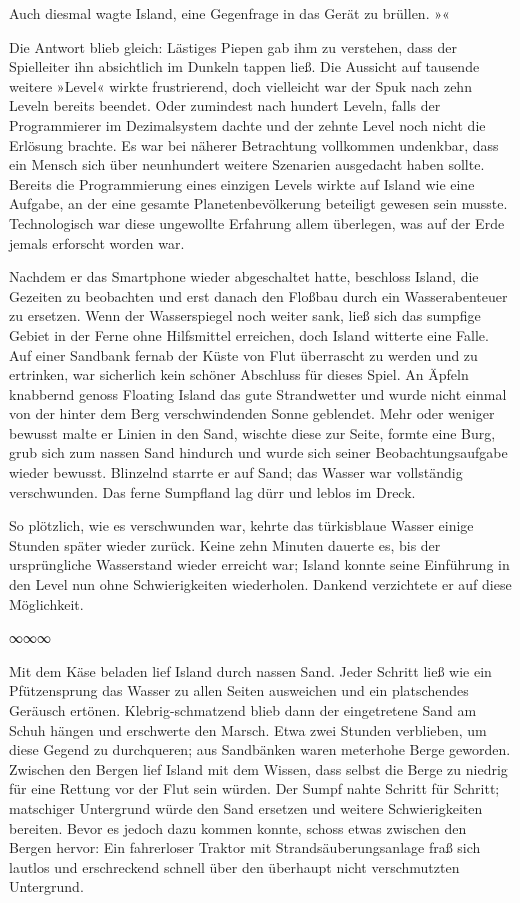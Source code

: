 
Auch diesmal wagte Island, eine Gegenfrage in das Gerät zu brüllen. »«

Die Antwort blieb gleich: Lästiges Piepen gab ihm zu verstehen, dass der Spielleiter ihn absichtlich im Dunkeln tappen ließ. Die Aussicht auf tausende weitere »Level« wirkte frustrierend, doch vielleicht war der Spuk nach zehn Leveln bereits beendet. Oder zumindest nach hundert Leveln, falls der Programmierer im Dezimalsystem dachte und der zehnte Level noch nicht die Erlösung brachte. Es war bei näherer Betrachtung vollkommen undenkbar, dass ein Mensch sich über neunhundert weitere Szenarien ausgedacht haben sollte. Bereits die Programmierung eines einzigen Levels wirkte auf Island wie eine Aufgabe, an der eine gesamte Planetenbevölkerung beteiligt gewesen sein musste. Technologisch war diese ungewollte Erfahrung allem überlegen, was auf der Erde jemals erforscht worden war.

Nachdem er das Smartphone wieder abgeschaltet hatte, beschloss Island, die Gezeiten zu beobachten und erst danach den Floßbau durch ein Wasserabenteuer zu ersetzen. Wenn der Wasserspiegel noch weiter sank, ließ sich das sumpfige Gebiet in der Ferne ohne Hilfsmittel erreichen, doch Island witterte eine Falle. Auf einer Sandbank fernab der Küste von Flut überrascht zu werden und zu ertrinken, war sicherlich kein schöner Abschluss für dieses Spiel. An Äpfeln knabbernd genoss Floating Island das gute Strandwetter und wurde nicht einmal von der hinter dem Berg verschwindenden Sonne geblendet. Mehr oder weniger bewusst malte er Linien in den Sand, wischte diese zur Seite, formte eine Burg, grub sich zum nassen Sand hindurch und wurde sich seiner Beobachtungsaufgabe wieder bewusst. Blinzelnd starrte er auf Sand; das Wasser war vollständig verschwunden. Das ferne Sumpfland lag dürr und leblos im Dreck.

So plötzlich, wie es verschwunden war, kehrte das türkisblaue Wasser einige Stunden später wieder zurück. Keine zehn Minuten dauerte es, bis der ursprüngliche Wasserstand wieder erreicht war; Island konnte seine Einführung in den Level nun ohne Schwierigkeiten wiederholen. Dankend verzichtete er auf diese Möglichkeit.

\begin{center}
∞∞∞
\end{center}

Mit dem Käse beladen lief Island durch nassen Sand. Jeder Schritt ließ wie ein Pfützensprung das Wasser zu allen Seiten ausweichen und ein platschendes Geräusch ertönen. Klebrig-schmatzend blieb dann der eingetretene Sand am Schuh hängen und erschwerte den Marsch. Etwa zwei Stunden verblieben, um diese Gegend zu durchqueren; aus Sandbänken waren meterhohe Berge geworden. Zwischen den Bergen lief Island mit dem Wissen, dass selbst die Berge zu niedrig für eine Rettung vor der Flut sein würden. Der Sumpf nahte Schritt für Schritt; matschiger Untergrund würde den Sand ersetzen und weitere Schwierigkeiten bereiten. Bevor es jedoch dazu kommen konnte, schoss etwas zwischen den Bergen hervor: Ein fahrerloser Traktor mit Strandsäuberungsanlage fraß sich lautlos und erschreckend schnell über den überhaupt nicht verschmutzten Untergrund.

